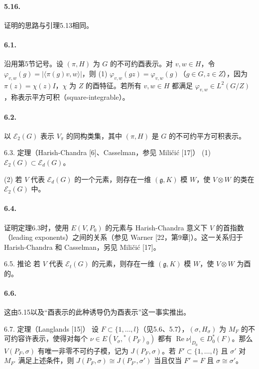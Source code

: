\paragraph*{5.16.} 证明的思路与引理5.13相同。

\paragraph*{6.1.} 沿用第5节记号。设 $(\pi,H)$ 为 $G$ 的不可约酉表示。对 $v,w\in H$，令 $\varphi_{v,w}(g)=|\langle\pi(g)v,w\rangle|$，则 (1) $\varphi_{v,w}(gz)=\varphi_{v,w}(g)$（$g\in G,z\in Z$），因为 $\pi(z)=\chi(z)I$，$\chi$ 为 $Z$ 的酉特征。若所有 $v,w\in H$ 都满足 $\varphi_{v,w}\in L^2(G/Z)$，称表示平方可积（square-integrable）。
\paragraph*{6.2.} 以 $\mathcal E_2(G)$ 表示 $V_\pi$ 的同构类集，其中 $(\pi,H)$ 是 $G$ 的不可约平方可积表示。
\begin{originaltheorem}{6.3. 定理（Harish-Chandra [6]、Casselman，参见 Miličić [17]）}
(1) $\mathcal E_2(G)\subset\mathcal E_d(G)$。

(2) 若 $V$ 代表 $\mathcal E_d(G)$ 的一个元素，则存在一维 $(\mathfrak g,K)$ 模 $W$，使 $V\otimes W$ 的类在 $\mathcal E_2(G)$ 中。
\end{originaltheorem}
\paragraph*{6.4.} 证明定理6.3时，使用 $E(V,P_0)$ 的元素与 Harish-Chandra 意义下 $V$ 的首指数（leading exponents）之间的关系（参见 Warner [22，第9章]）。这一关系归于 Harish-Chandra 和 Casselman，另见 Miličić [17]。
\begin{originaltheorem}{6.5. 推论}
若 $V$ 代表 $\mathcal E_t(G)$ 的元素，则存在一维 $(\mathfrak g,K)$ 模 $W$，使 $V\otimes W$ 为酉的。
\end{originaltheorem}
\paragraph*{6.6.} 这由5.15以及“酉表示的此种诱导仍为酉表示”这一事实推出。
\begin{originaltheorem}{6.7. 定理（Langlands [15]）}
设 $F\subset\{1,\ldots,l\}$（见5.6、5.7），$(\sigma,H_\sigma)$ 为 $M_F$ 的不可约容许表示，使得对每个 $\nu\in E(V_\sigma,{}^*(P_F)_0)$ 都有 $\operatorname{Re}\nu|_{D_0}\in D_0^*(F)$。那么 $V(P_F,\sigma)$ 有唯一非零不可约子模，记为 $J(P_F,\sigma)$。若 $F'\subset\{1,\ldots,l\}$ 且 $\sigma'$ 对 $M_{F'}$ 满足上述条件，则 $J(P_F,\sigma)\cong J(P_{F'},\sigma')$ 当且仅当 $F'=F$ 且 $\sigma\cong\sigma'$。
\end{originaltheorem}
